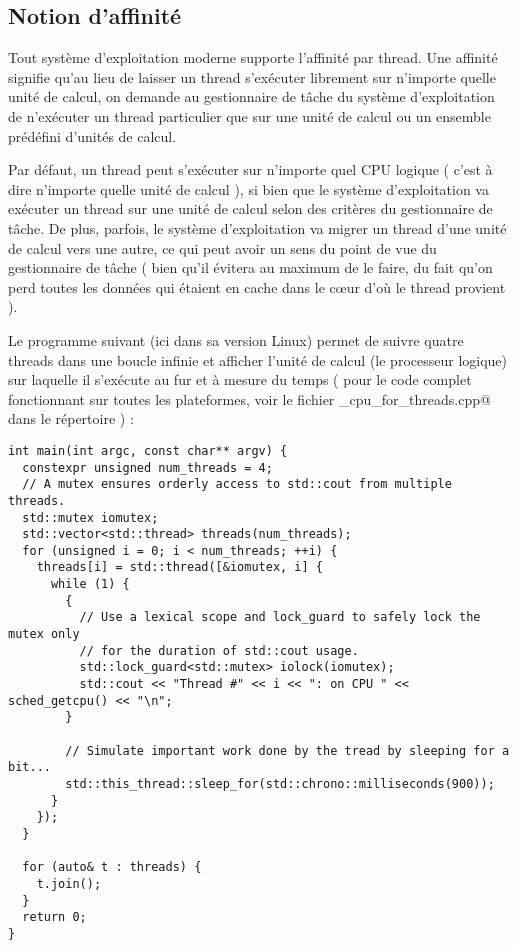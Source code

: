 \documentclass[fleqn,11pt]{article}
\begin{document}
\subsection{Notion d'affinité}

Tout système d'exploitation moderne supporte l'affinité par thread. Une affinité signifie qu'au lieu de laisser un thread s'exécuter librement sur n'importe quelle unité de calcul, on demande au gestionnaire de tâche du système d'exploitation de n'exécuter un thread particulier que sur une unité de calcul ou un ensemble prédéfini d'unités de calcul.

Par défaut, un thread peut s'exécuter sur n'importe quel CPU logique ( c'est à dire n'importe quelle unité de calcul ), si bien que le système d'exploitation va exécuter un thread sur une unité de calcul selon des critères du gestionnaire de tâche. De plus, parfois, le système d'exploitation va migrer un thread d'une unité de calcul vers une autre, ce qui peut avoir un sens du point de vue du gestionnaire de tâche ( bien qu'il évitera au maximum de le faire, du fait qu'on perd toutes les données qui étaient en cache dans le c{\oe}ur d'où le thread provient ).

Le programme suivant (ici dans sa version Linux) permet de suivre quatre threads
dans une boucle infinie et afficher l'unité de calcul (le processeur logique) sur laquelle il s'exécute au fur et à mesure du temps ( pour le code complet fonctionnant sur toutes les plateformes, voir le fichier \verb@get_cpu_for_threads.cpp@ dans le répertoire \verb@Example@) :
\begin{lstlisting}
int main(int argc, const char** argv) {
  constexpr unsigned num_threads = 4;
  // A mutex ensures orderly access to std::cout from multiple threads.
  std::mutex iomutex;
  std::vector<std::thread> threads(num_threads);
  for (unsigned i = 0; i < num_threads; ++i) {
    threads[i] = std::thread([&iomutex, i] {
      while (1) {
        {
          // Use a lexical scope and lock_guard to safely lock the mutex only
          // for the duration of std::cout usage.
          std::lock_guard<std::mutex> iolock(iomutex);
          std::cout << "Thread #" << i << ": on CPU " << sched_getcpu() << "\n";
        }

        // Simulate important work done by the tread by sleeping for a bit...
        std::this_thread::sleep_for(std::chrono::milliseconds(900));
      }
    });
  }

  for (auto& t : threads) {
    t.join();
  }
  return 0;
}
\end{lstlisting}
\end{document}
